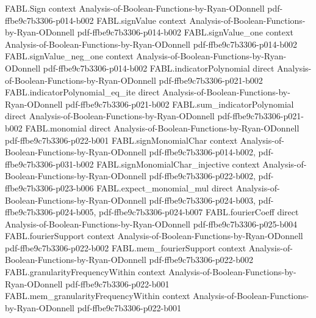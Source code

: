 \begin{theorem}
\label{FABL.parseval}
\leanok
{}
\proofstep
  {FABL.Sign}
  {context}
  {Analysis-of-Boolean-Functions-by-Ryan-ODonnell}
  {pdf-ffbe9c7b3306-p014-b002}
\proofstep
  {FABL.signValue}
  {context}
  {Analysis-of-Boolean-Functions-by-Ryan-ODonnell}
  {pdf-ffbe9c7b3306-p014-b002}
\proofstep
  {FABL.signValue_one}
  {context}
  {Analysis-of-Boolean-Functions-by-Ryan-ODonnell}
  {pdf-ffbe9c7b3306-p014-b002}
\proofstep
  {FABL.signValue_neg_one}
  {context}
  {Analysis-of-Boolean-Functions-by-Ryan-ODonnell}
  {pdf-ffbe9c7b3306-p014-b002}
\proofstep
  {FABL.indicatorPolynomial}
  {direct}
  {Analysis-of-Boolean-Functions-by-Ryan-ODonnell}
  {pdf-ffbe9c7b3306-p021-b002}
\proofstep
  {FABL.indicatorPolynomial_eq_ite}
  {direct}
  {Analysis-of-Boolean-Functions-by-Ryan-ODonnell}
  {pdf-ffbe9c7b3306-p021-b002}
\proofstep
  {FABL.sum_indicatorPolynomial}
  {direct}
  {Analysis-of-Boolean-Functions-by-Ryan-ODonnell}
  {pdf-ffbe9c7b3306-p021-b002}
\proofstep
  {FABL.monomial}
  {direct}
  {Analysis-of-Boolean-Functions-by-Ryan-ODonnell}
  {pdf-ffbe9c7b3306-p022-b001}
\proofstep
  {FABL.signMonomialChar}
  {context}
  {Analysis-of-Boolean-Functions-by-Ryan-ODonnell}
  {pdf-ffbe9c7b3306-p014-b002,
    pdf-ffbe9c7b3306-p031-b002}
\proofstep
  {FABL.signMonomialChar_injective}
  {context}
  {Analysis-of-Boolean-Functions-by-Ryan-ODonnell}
  {pdf-ffbe9c7b3306-p022-b002,
    pdf-ffbe9c7b3306-p023-b006}
\proofstep
  {FABL.expect_monomial_mul}
  {direct}
  {Analysis-of-Boolean-Functions-by-Ryan-ODonnell}
  {pdf-ffbe9c7b3306-p024-b003,
    pdf-ffbe9c7b3306-p024-b005,
    pdf-ffbe9c7b3306-p024-b007}
\proofstep
  {FABL.fourierCoeff}
  {direct}
  {Analysis-of-Boolean-Functions-by-Ryan-ODonnell}
  {pdf-ffbe9c7b3306-p025-b004}
\proofstep
  {FABL.fourierSupport}
  {context}
  {Analysis-of-Boolean-Functions-by-Ryan-ODonnell}
  {pdf-ffbe9c7b3306-p022-b002}
\proofstep
  {FABL.mem_fourierSupport}
  {context}
  {Analysis-of-Boolean-Functions-by-Ryan-ODonnell}
  {pdf-ffbe9c7b3306-p022-b002}
\proofstep
  {FABL.granularityFrequencyWithin}
  {context}
  {Analysis-of-Boolean-Functions-by-Ryan-ODonnell}
  {pdf-ffbe9c7b3306-p022-b001}
\proofstep
  {FABL.mem_granularityFrequencyWithin}
  {context}
  {Analysis-of-Boolean-Functions-by-Ryan-ODonnell}
  {pdf-ffbe9c7b3306-p022-b001}

\end{theorem}
